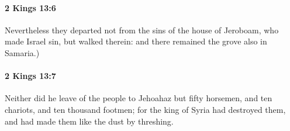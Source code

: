 		\paragraph{2 Kings 13:6} %
			\label{2KINGS-13-6}

			Nevertheless they departed not from the sins of the house of Jeroboam, who made Israel sin, but walked therein: and there remained the grove also in Samaria.)


		\paragraph{2 Kings 13:7} %
			\label{2KINGS-13-7}

			Neither did he leave of the people to Jehoahaz but fifty horsemen, and ten chariots, and ten thousand footmen; for the king of Syria had destroyed them, and had made them like the dust by threshing.


